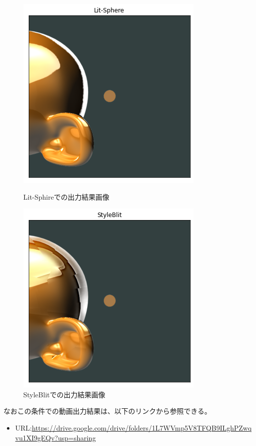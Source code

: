 \documentclass[dvipdfmx]{jsarticle}
\begin{document}
\begin{figure}[H]
 \begin{minipage}{0.5\hsize}
  \begin{center}
   \includegraphics[scale=0.4]{images/suzzanne_lit_out2.png}
  \end{center}
  \caption{Lit-Sphireでの出力結果画像}
 \end{minipage}
 \begin{minipage}{0.5\hsize}
  \begin{center}
   \includegraphics[scale=0.4]{images/suzzanne_sytle_out2.png}
  \end{center}
  \caption{StyleBlitでの出力結果画像}
 \end{minipage}
\end{figure}
なおこの条件での動画出力結果は、以下のリンクから参照できる。
\begin{itemize}
  \item URL:\url{https://drive.google.com/drive/folders/1L7WVmp5V8TFQB9ILghPZwqvu1XI9gEQv?usp=sharing}
\end{itemize}
\end{document}
